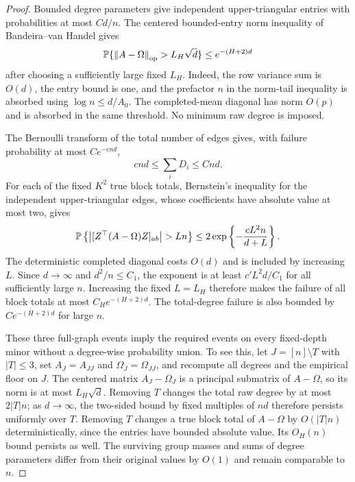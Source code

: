 \begin{proof}
Bounded degree parameters give independent upper-triangular entries
with probabilities at most $Cd/n$. The centered bounded-entry norm
inequality of Bandeira--van Handel
\cite[Corollary 3.12 and Remark 3.13]{bvh} gives
\[
 \mathbb P\{\left\lVert A-\Omega\right\rVert_{\mathrm{op}}>L_H\sqrt d\}
 \le e^{-(H+2)d}
\]
after choosing a sufficiently large fixed $L_H$. Indeed, the row
variance sum is $O(d)$, the entry bound is one, and the prefactor $n$
in the norm-tail inequality is absorbed using $\log n\le d/A_0$.
The completed-mean diagonal has norm $O(p)$ and is absorbed in the
same threshold. No minimum raw degree is imposed.

The Bernoulli transform of the total number of edges gives, with
failure probability at most $Ce^{-cnd}$,
\[
 cnd\le\sum_iD_i\le Cnd.
\]
For each of the fixed $K^2$ true block totals, Bernstein's inequality
for the independent upper-triangular edges, whose coefficients have
absolute value at most two, gives
\[
 \PP\left\{\left|[Z^\top(A-\Omega)Z]_{ab}\right|>Ln\right\}
 \le 2\exp\left\{-\frac{cL^2n}{d+L}\right\}.
\]
The deterministic completed diagonal costs $O(d)$ and is included
by increasing $L$. Since $d\to\infty$ and $d^2/n\le C_1$,
the exponent is at least $c'L^2d/C_1$ for all sufficiently large $n$.
Increasing the fixed $L=L_H$ therefore makes the failure of all block
totals at most $C_He^{-(H+2)d}$. The total-degree failure is also
bounded by $Ce^{-(H+2)d}$ for large $n$.

These three full-graph events imply the required events on every
fixed-depth minor without a degree-wise probability union. To see this,
let $J=[n]\setminus T$ with $|T|\le3$, set $A_J=A_{JJ}$ and
$\Omega_J=\Omega_{JJ}$, and recompute all degrees and the empirical
floor on $J$. The centered matrix $A_J-\Omega_J$ is a principal
submatrix of $A-\Omega$, so its norm is at most $L_H\sqrt d$.
Removing $T$ changes the total raw degree by at most $2|T|n$;
as $d\to\infty$, the two-sided bound by fixed multiples of $nd$
therefore persists uniformly over $T$. Removing $T$ changes a true
block total of $A-\Omega$ by $O(|T|n)$ deterministically, since
the entries have bounded absolute value. Its $O_H(n)$ bound persists
as well. The surviving group masses and sums of degree parameters differ from
their original values by $O(1)$ and remain comparable to $n$.


\end{proof}
